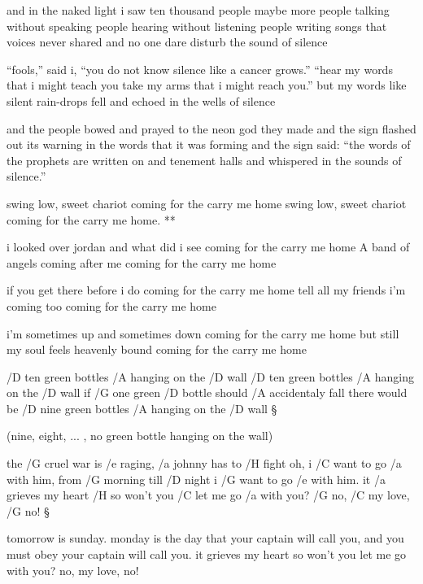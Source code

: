 and in the naked light i saw
ten thousand people maybe more
people talking without speaking
people hearing without listening
people writing songs that voices never shared
and no one dare disturb the sound of silence \s

``fools,'' said i, ``you do not know
silence like a cancer grows.''
``hear my words that i might teach you
take my arms that i might reach you.''
but my words like silent rain-drops fell
and echoed in the wells of silence \s

and the people bowed and prayed
to the neon god they made
and the sign flashed out its warning
in the words that it was forming
and the sign said: ``the words of the prophets are written on 
and tenement halls
and whispered in the sounds of silence.''




\R  swing low, sweet chariot
coming for the carry me home
swing low, sweet chariot
coming for the carry me home. **

i looked over jordan and what did i see
coming for the carry me home
A band of angels coming after me
coming for the carry me home \s

if you get there before i do
coming for the carry me home
tell all my friends i'm coming too
coming for the carry me home \s

i'm sometimes up and sometimes down
coming for the carry me home
but still my soul feels heavenly bound
coming for the carry me home




/D ten green bottles /A hanging on the /D wall
/D ten green bottles /A hanging on the /D wall
if /G one green /D bottle should /A accidentaly fall
there would be /D nine green bottles /A hanging on the /D wall \S

(nine, eight, ... , no green bottle hanging on the wall)




the /G cruel war is /e raging, /a johnny has to /H fight
oh, i /C want to go /a with him, from /G morning till /D night
i /G want to go /e with him. it /a grieves my heart /H so
won't you /C let me go /a with you? /G no, /C my love, /G no! \S

tomorrow is sunday. monday is the day
that your captain will call you, and you must obey
your captain will call you. it grieves my heart so
won't you let me go with you? no, my love, no! \s

